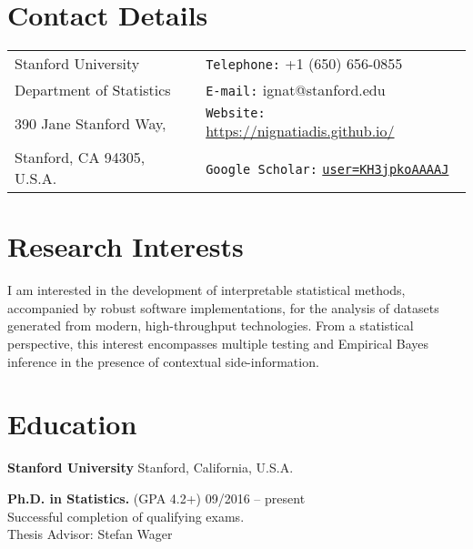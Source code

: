 \documentclass[margin,line]{res}
\newenvironment{list1}{
  \begin{list}{\ding{113}}{%
      \setlength{\itemsep}{0in}
      \setlength{\parsep}{0in} \setlength{\parskip}{0in}
      \setlength{\topsep}{0in} \setlength{\partopsep}{0in}
      \setlength{\leftmargin}{0.17in}}}{\end{list}}
\begin{document}

\begin{resume}
\section{\sc Contact Details}
\vspace{.05in}
\begin{tabular}{@{}p{2in}p{4in}}
Stanford University             & {\tt Telephone:}  +1 (650) 656-0855 \\
Department of Statistics   & {\tt E-mail:}    ignat@stanford.edu \\
390 Jane Stanford Way, &  {\tt Website:} \url{https://nignatiadis.github.io/}\\
Stanford, CA 94305, U.S.A.  & {\tt Google Scholar:} \href{https://scholar.google.com/citations?user=KH3jpkoAAAAJ}{\tt user=KH3jpkoAAAAJ} \\
\end{tabular}



\section{\sc Research Interests}
I am interested in the development of interpretable statistical methods, accompanied by robust software implementations, for the analysis of datasets generated from modern, high-throughput technologies. From a statistical perspective, this interest encompasses multiple testing and Empirical Bayes inference in the presence of contextual side-information.

\section{\sc Education}
{\bf Stanford University} \hfill Stanford, California, U.S.A.\\
\vspace*{-.14in}
\begin{list1}
\item[]
\textbf{Ph.D. in Statistics.}  (GPA 4.2+) \hfill  09/2016 -- present\\
Successful completion of qualifying exams.\\
Thesis Advisor: Stefan Wager
\end{list1}


\end{resume}
\end{document}
